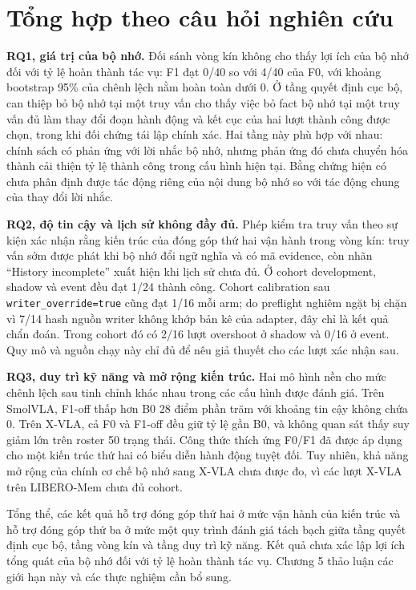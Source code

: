 \section{Tổng hợp theo câu hỏi nghiên cứu}
\label{sec:ch4-rq-summary}

\textbf{RQ1, giá trị của bộ nhớ.} Đối sánh vòng kín không cho thấy lợi ích của bộ nhớ đối với tỷ lệ hoàn thành tác vụ: F1 đạt 0/40 so với 4/40 của F0, với khoảng bootstrap 95\% của chênh lệch nằm hoàn toàn dưới 0. Ở tầng quyết định cục bộ, can thiệp bỏ bộ nhớ tại một truy vấn cho thấy việc bỏ fact bộ nhớ tại một truy vấn đủ làm thay đổi đoạn hành động và kết cục của hai lượt thành công được chọn, trong khi đối chứng tái lập chính xác. Hai tầng này phù hợp với nhau: chính sách có phản ứng với lời nhắc bộ nhớ, nhưng phản ứng đó chưa chuyển hóa thành cải thiện tỷ lệ thành công trong cấu hình hiện tại. Bằng chứng hiện có chưa phân định được tác động riêng của nội dung bộ nhớ so với tác động chung của thay đổi lời nhắc.

\textbf{RQ2, độ tin cậy và lịch sử không đầy đủ.} Phép kiểm tra truy vấn theo sự kiện xác nhận rằng kiến trúc của đóng góp thứ hai vận hành trong vòng kín: truy vấn sớm được phát khi bộ nhớ đổi ngữ nghĩa và có mã evidence, còn nhãn ``History incomplete'' xuất hiện khi lịch sử chưa đủ. Ở cohort development, shadow và event đều đạt 1/24 thành công. Cohort calibration sau \texttt{writer\_override=true} cũng đạt 1/16 mỗi arm; do preflight nghiêm ngặt bị chặn vì 7/14 hash nguồn writer không khớp bản kê của adapter, đây chỉ là kết quả chẩn đoán. Trong cohort đó có 2/16 lượt overshoot ở shadow và 0/16 ở event. Quy mô và nguồn chạy này chỉ đủ để nêu giả thuyết cho các lượt xác nhận sau.

\textbf{RQ3, duy trì kỹ năng và mở rộng kiến trúc.} Hai mô hình nền cho mức chênh lệch sau tinh chỉnh khác nhau trong các cấu hình được đánh giá. Trên SmolVLA, F1-off thấp hơn B0 28 điểm phần trăm với khoảng tin cậy không chứa 0. Trên X-VLA, cả F0 và F1-off đều giữ tỷ lệ gần B0, và không quan sát thấy suy giảm lớn trên roster 50 trạng thái. Công thức thích ứng F0/F1 đã được áp dụng cho một kiến trúc thứ hai có biểu diễn hành động tuyệt đối. Tuy nhiên, khả năng mở rộng của chính cơ chế bộ nhớ sang X-VLA chưa được đo, vì các lượt X-VLA trên LIBERO-Mem chưa đủ cohort.

Tổng thể, các kết quả hỗ trợ đóng góp thứ hai ở mức vận hành của kiến trúc và hỗ trợ đóng góp thứ ba ở mức một quy trình đánh giá tách bạch giữa tầng quyết định cục bộ, tầng vòng kín và tầng duy trì kỹ năng. Kết quả chưa xác lập lợi ích tổng quát của bộ nhớ đối với tỷ lệ hoàn thành tác vụ. Chương 5 thảo luận các giới hạn này và các thực nghiệm cần bổ sung.
